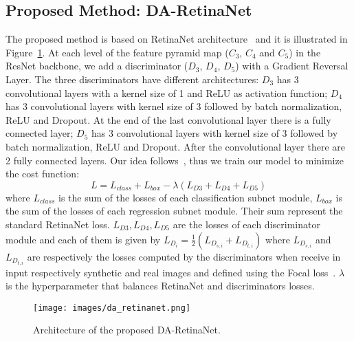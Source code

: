 \documentclass[preprint]{elsarticle}
\begin{document}
\subsection{Proposed Method: DA-RetinaNet}
\label{DAretinanet}
The proposed method is based on RetinaNet architecture~\cite{DBLP:journals/corr/abs-1708-02002} and it is illustrated in Figure~\ref{fig:DA-Retinanet}. At each level of the feature pyramid map ($C_3$, $C_4$ and $C_5$) in the ResNet backbone, we add a discriminator ($D_3$, $D_4$, $D_5$) with a Gradient Reversal Layer. The three discriminators have different architectures: $D_3$ has 3 convolutional layers with a kernel size of 1 and ReLU as activation function; $D_4$ has 3 convolutional layers with kernel size of 3 followed by batch normalization, ReLU and Dropout. At the end of the last convolutional layer there is a fully connected layer; $D_5$ has 3 convolutional layers with kernel size of 3 followed by batch normalization, ReLU and Dropout. After the convolutional layer there are 2 fully connected layers. Our idea follows~\cite{ganin2014unsupervised}, thus we train our model to minimize the cost function:
\begin{equation}
    L=L_{class}+L_{box}-\lambda(L_{D3}+L_{D4}+L_{D5})
\end{equation}
where $L_{class}$ is the sum of the losses of each classification subnet module, $L_{box}$ is the sum of the losses of each regression subnet module. Their sum represent the standard RetinaNet loss. $L_{D3},L_{D4},L_{D5}$ are the losses of each discriminator module and each of them is given by $L_{D_i}=\frac{1}{2}(L_{D_{s,i}}+L_{D_{t,i}})$ where $L_{D_{s,i}}$ and $L_{D_{t,i}}$ are respectively the losses computed by the discriminators when receive in input respectively synthetic and real images and defined using the Focal loss~\cite{DBLP:journals/corr/abs-1708-02002}. $\lambda$ is the hyperparameter that balances RetinaNet and discriminators losses. 
 \begin{figure}[t]
    \centering
	\texttt{[image: images/da\_retinanet.png]} 
	\caption{Architecture of the proposed DA-RetinaNet.}
	\label{fig:DA-Retinanet} 
\end{figure}
\end{document}
